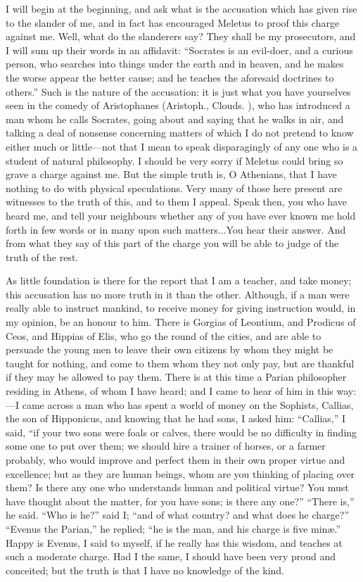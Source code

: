 \documentclass[11pt,letter]{article}
\begin{document}
\par  I will begin at the beginning, and ask what is the accusation which has given rise to the slander of me, and in fact has encouraged Meletus to proof this charge against me. Well, what do the slanderers say? They shall be my prosecutors, and I will sum up their words in an affidavit: “Socrates is an evil-doer, and a curious person, who searches into things under the earth and in heaven, and he makes the worse appear the better cause; and he teaches the aforesaid doctrines to others.” Such is the nature of the accusation: it is just what you have yourselves seen in the comedy of Aristophanes (Aristoph., Clouds. ), who has introduced a man whom he calls Socrates, going about and saying that he walks in air, and talking a deal of nonsense concerning matters of which I do not pretend to know either much or little—not that I mean to speak disparagingly of any one who is a student of natural philosophy. I should be very sorry if Meletus could bring so grave a charge against me. But the simple truth is, O Athenians, that I have nothing to do with physical speculations. Very many of those here present are witnesses to the truth of this, and to them I appeal. Speak then, you who have heard me, and tell your neighbours whether any of you have ever known me hold forth in few words or in many upon such matters...You hear their answer. And from what they say of this part of the charge you will be able to judge of the truth of the rest.

\par  As little foundation is there for the report that I am a teacher, and take money; this accusation has no more truth in it than the other. Although, if a man were really able to instruct mankind, to receive money for giving instruction would, in my opinion, be an honour to him. There is Gorgias of Leontium, and Prodicus of Ceos, and Hippias of Elis, who go the round of the cities, and are able to persuade the young men to leave their own citizens by whom they might be taught for nothing, and come to them whom they not only pay, but are thankful if they may be allowed to pay them. There is at this time a Parian philosopher residing in Athens, of whom I have heard; and I came to hear of him in this way:—I came across a man who has spent a world of money on the Sophists, Callias, the son of Hipponicus, and knowing that he had sons, I asked him: “Callias,” I said, “if your two sons were foals or calves, there would be no difficulty in finding some one to put over them; we should hire a trainer of horses, or a farmer probably, who would improve and perfect them in their own proper virtue and excellence; but as they are human beings, whom are you thinking of placing over them? Is there any one who understands human and political virtue? You must have thought about the matter, for you have sons; is there any one?” “There is,” he said. “Who is he?” said I; “and of what country? and what does he charge?” “Evenus the Parian,” he replied; “he is the man, and his charge is five minæ.” Happy is Evenus, I said to myself, if he really has this wisdom, and teaches at such a moderate charge. Had I the same, I should have been very proud and conceited; but the truth is that I have no knowledge of the kind.
\end{document}
